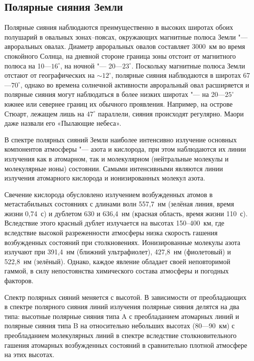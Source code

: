 \documentclass[a4paper,14pt]{article}
\begin{document}
				\subsection*{Полярные сияния Земли}
				
				Полярные сияния наблюдаются преимущественно в высоких широтах обоих полушарий в овальных зонах--поясах, окружающих магнитные полюса Земли "--- авроральных овалах. Диаметр авроральных овалов составляет 3000~км во время спокойного Солнца, на дневной стороне граница зоны отстоит от магнитного полюса на 10---$16^\circ$, на ночной "--- 20---$23^\circ$. Поскольку магнитные полюса Земли отстают от географических на $\sim$$12^\circ$, полярные сияния наблюдаются в широтах 67---$70^\circ$, однако во времена солнечной активности авроральный овал расширяется и полярные сияния могут наблюдаться в более низких широтах "--- на 20---$25^\circ$ южнее или севернее границ их обычного проявления. Например, на острове Стюарт, лежащем лишь на $47^\circ$ параллели, сияния происходят регулярно. Маори даже назвали его «Пылающие небеса».
				
				
				В спектре полярных сияний Земли наиболее интенсивно излучение основных компонентов атмосферы "--- азота и кислорода, при этом наблюдаются их линии излучения как в атомарном, так и молекулярном (нейтральные молекулы и молекулярные ионы) состоянии. Самыми интенсивными являются линии излучения атомарного кислорода и ионизированных молекул азота.
				
				Свечение кислорода обусловлено излучением возбужденных атомов в метастабильных состояниях с длинами волн 557,7~нм (зелёная линия, время жизни 0,74~с) и дублетом 630 и 636,4~нм (красная область, время жизни 110~с). Вследствие этого красный дублет излучается на высотах 150--400~км, где вследствие высокой разреженности атмосферы низка скорость гашения возбужденных состояний при столкновениях. Ионизированные молекулы азота излучают при 391,4~нм (ближний ультрафиолет), 427,8~нм (фиолетовый) и 522,8~нм (зелёный). Однако, каждое явление обладает своей неповторимой гаммой, в силу непостоянства химического состава атмосферы и погодных факторов.
				
				Спектр полярных сияний меняется с высотой. В зависимости от преобладающих в спектре полярного сияния линий излучения полярные сияния делятся на два типа: высотные полярные сияния типа A с преобладанием атомарных линий и полярные сияния типа B на относительно небольших высотах (80---90~км) с преобладанием молекулярных линий в спектре вследствие столкновительного гашения атомарных возбужденных состояний в сравнительно плотной атмосфере на этих высотах.
				
\end{document}

